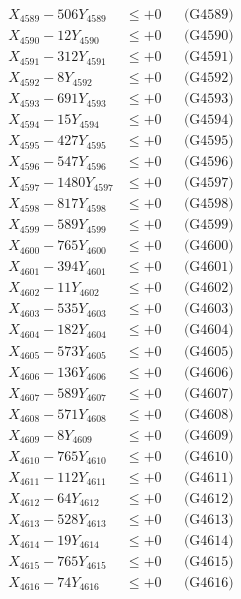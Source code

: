 \documentclass[a4paper,10pt]{article}
\begin{document}
{\begin{align}
X_{4589} - 506Y_{4589} &\leq +0 && \text{(G4589)} \\
X_{4590} - 12Y_{4590} &\leq +0 && \text{(G4590)} \\
\allowbreak
X_{4591} - 312Y_{4591} &\leq +0 && \text{(G4591)} \\
X_{4592} - 8Y_{4592} &\leq +0 && \text{(G4592)} \\
X_{4593} - 691Y_{4593} &\leq +0 && \text{(G4593)} \\
X_{4594} - 15Y_{4594} &\leq +0 && \text{(G4594)} \\
X_{4595} - 427Y_{4595} &\leq +0 && \text{(G4595)} \\
X_{4596} - 547Y_{4596} &\leq +0 && \text{(G4596)} \\
X_{4597} - 1480Y_{4597} &\leq +0 && \text{(G4597)} \\
X_{4598} - 817Y_{4598} &\leq +0 && \text{(G4598)} \\
X_{4599} - 589Y_{4599} &\leq +0 && \text{(G4599)} \\
X_{4600} - 765Y_{4600} &\leq +0 && \text{(G4600)} \\
\allowbreak
X_{4601} - 394Y_{4601} &\leq +0 && \text{(G4601)} \\
X_{4602} - 11Y_{4602} &\leq +0 && \text{(G4602)} \\
X_{4603} - 535Y_{4603} &\leq +0 && \text{(G4603)} \\
X_{4604} - 182Y_{4604} &\leq +0 && \text{(G4604)} \\
X_{4605} - 573Y_{4605} &\leq +0 && \text{(G4605)} \\
X_{4606} - 136Y_{4606} &\leq +0 && \text{(G4606)} \\
X_{4607} - 589Y_{4607} &\leq +0 && \text{(G4607)} \\
X_{4608} - 571Y_{4608} &\leq +0 && \text{(G4608)} \\
X_{4609} - 8Y_{4609} &\leq +0 && \text{(G4609)} \\
X_{4610} - 765Y_{4610} &\leq +0 && \text{(G4610)} \\
\allowbreak
X_{4611} - 112Y_{4611} &\leq +0 && \text{(G4611)} \\
X_{4612} - 64Y_{4612} &\leq +0 && \text{(G4612)} \\
X_{4613} - 528Y_{4613} &\leq +0 && \text{(G4613)} \\
X_{4614} - 19Y_{4614} &\leq +0 && \text{(G4614)} \\
X_{4615} - 765Y_{4615} &\leq +0 && \text{(G4615)} \\
X_{4616} - 74Y_{4616} &\leq +0 && \text{(G4616)} \\

\end{align}}
\end{document}

